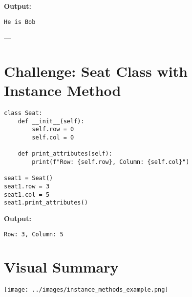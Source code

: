 \textbf{Output:}
\begin{verbatim}
He is Bob
\end{verbatim}

---

\section{Challenge: Seat Class with Instance Method}

\begin{verbatim}
class Seat:
    def __init__(self):
        self.row = 0
        self.col = 0

    def print_attributes(self):
        print(f"Row: {self.row}, Column: {self.col}")

seat1 = Seat()
seat1.row = 3
seat1.col = 5
seat1.print_attributes()
\end{verbatim}

\textbf{Output:}
\begin{verbatim}
Row: 3, Column: 5
\end{verbatim}

\section*{Visual Summary}
\begin{center}
\texttt{[image: ../images/instance\_methods\_example.png]}
\end{center}

